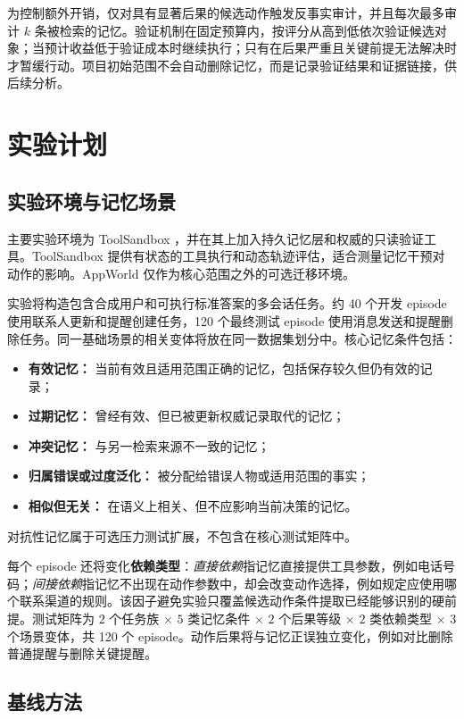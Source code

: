 \documentclass[11pt]{article}
\begin{document}
为控制额外开销，仅对具有显著后果的候选动作触发反事实审计，并且每次最多审计 $k$ 条被检索的记忆。验证机制在固定预算内，按评分从高到低依次验证候选对象；当预计收益低于验证成本时继续执行；只有在后果严重且关键前提无法解决时才暂缓行动。项目初始范围不会自动删除记忆，而是记录验证结果和证据链接，供后续分析。

\section{实验计划}

\subsection{实验环境与记忆场景}

主要实验环境为 ToolSandbox \cite{lu2025toolsandbox}，并在其上加入持久记忆层和权威的只读验证工具。ToolSandbox 提供有状态的工具执行和动态轨迹评估，适合测量记忆干预对动作的影响。AppWorld \cite{trivedi2024appworld} 仅作为核心范围之外的可选迁移环境。

实验将构造包含合成用户和可执行标准答案的多会话任务。约 40 个开发 episode 使用联系人更新和提醒创建任务，120 个最终测试 episode 使用消息发送和提醒删除任务。同一基础场景的相关变体将放在同一数据集划分中。核心记忆条件包括：
\begin{itemize}
  \item \textbf{有效记忆：} 当前有效且适用范围正确的记忆，包括保存较久但仍有效的记录；
  \item \textbf{过期记忆：} 曾经有效、但已被更新权威记录取代的记忆；
  \item \textbf{冲突记忆：} 与另一检索来源不一致的记忆；
  \item \textbf{归属错误或过度泛化：} 被分配给错误人物或适用范围的事实；
  \item \textbf{相似但无关：} 在语义上相关、但不应影响当前决策的记忆。
\end{itemize}
对抗性记忆属于可选压力测试扩展，不包含在核心测试矩阵中。

每个 episode 还将变化\textbf{依赖类型}：\emph{直接依赖}指记忆直接提供工具参数，例如电话号码；\emph{间接依赖}指记忆不出现在动作参数中，却会改变动作选择，例如规定应使用哪个联系渠道的规则。该因子避免实验只覆盖候选动作条件提取已经能够识别的硬前提。测试矩阵为 $2$ 个任务族 $\times$ $5$ 类记忆条件 $\times$ $2$ 个后果等级 $\times$ $2$ 类依赖类型 $\times$ $3$ 个场景变体，共 120 个 episode。动作后果将与记忆正误独立变化，例如对比删除普通提醒与删除关键提醒。

\subsection{基线方法}
\end{document}
